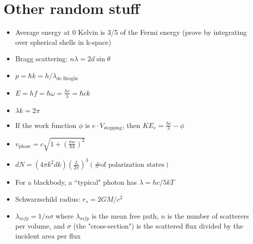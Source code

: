 \documentclass[12pt]{article}
\begin{document}
\section{Other random stuff}
\begin{itemize}
    \item Average energy at 0 Kelvin is 3/5 of the Fermi energy (prove by integrating over spherical shells in k-space)
    \item Bragg scattering: $n \lambda = 2 d \sin \theta$
    \item $p=\hbar k= h/\lambda_\text{de Broglie}$
    \item $E = h f = \hbar \omega = \frac{h c}{\lambda} = \hbar c k$
    \item $\lambda k = 2 \pi$
    \item If the work function $\phi$ is $e \cdot V_\text{stopping}$, then $KE_e = \frac{hc}{\lambda} - \phi$
    \item $v_\text{phase} = c \sqrt{1 + \left( \frac{mc}{\hbar k}  \right)^2}$
    \item $dN = (4 \pi k^2 dk) \left( \frac{L}{2 \pi} \right)^3 (\text{\# of polarization states})$
    \item For a blackbody, a ``typical" photon has $\lambda = hc/5kT$
    \item Schwarzschild radius: $r_s = 2GM/c^2$
    \item $\lambda_{mfp} = 1/n \sigma$ where $\lambda_{mfp}$ is the mean free path, $n$ is the number of scatterers per volume, and $\sigma$ (the "cross-section") is the scattered flux divided by the incident area per flux
\end{itemize}
\end{document}
